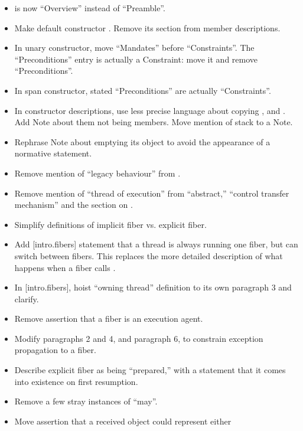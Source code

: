 \begin{itemize}
    \item {} is now ``Overview'' instead of ``Preamble''.
    \item Make default \fiber constructor .
          Remove its section from member descriptions.
    \item In unary constructor, move ``Mandates'' before ``Constraints''. The
          ``Preconditions'' entry is actually a Constraint: move it and remove
          ``Preconditions''.
    \item In span constructor, stated ``Preconditions'' are actually ``Constraints''.
    \item In constructor descriptions, use less precise language about copying
          ,  and . Add Note about them not
          being \fiber members. Move mention of stack to a Note.
    \item Rephrase \resumewith Note about emptying its \fiber object to avoid
          the appearance of a normative statement.
    \item Remove mention of ``legacy behaviour'' from
          .
    \item Remove mention of ``thread of execution'' from ``abstract,''
          ``control transfer mechanism'' and the section on \exfns.
    \item Simplify definitions of implicit fiber vs. explicit fiber.
    \item Add [intro.fibers] statement that a thread is always running one
          fiber, but can switch between fibers. This replaces the more
          detailed description of what happens when a fiber calls \anyresume.
    \item In [intro.fibers], hoist ``owning thread'' definition to its own
          paragraph 3 and clarify.
    \item Remove assertion that a fiber is an execution agent.
    \item Modify  paragraphs 2 and 4, and 
          paragraph 6, to constrain exception propagation to a fiber.
    \item Describe explicit fiber as being ``prepared,'' with a statement that
          it comes into existence on first resumption.
    \item Remove a few stray instances of ``may''.
    \item Move assertion that a received \fiber object could represent either

\end{itemize}
